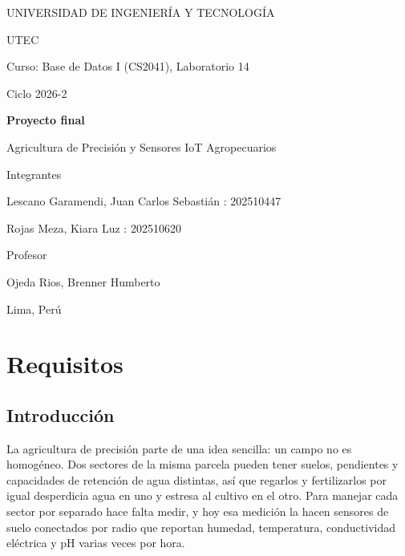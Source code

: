 \documentclass[11pt,letterpaper]{article}
\begin{document}
\begin{titlepage}
\centering
{\large UNIVERSIDAD DE INGENIERÍA Y TECNOLOGÍA\par}
\vspace{0.3cm}
{\large UTEC\par}
\vspace{2.2cm}
{\normalsize Curso: Base de Datos I (CS2041), Laboratorio 14\par}
\vspace{0.3cm}
{\normalsize Ciclo 2026-2\par}
\vspace{2cm}
{\LARGE\bfseries Proyecto final\par}
\vspace{0.4cm}
{\Large Agricultura de Precisión y Sensores IoT Agropecuarios\par}
\vspace{2.4cm}
{\large Integrantes\par}
\vspace{0.3cm}
Lescano Garamendi, Juan Carlos Sebastián : 202510447\par
Rojas Meza, Kiara Luz : 202510620\par
\vspace{1.6cm}
{\large Profesor\par}
\vspace{0.3cm}
Ojeda Rios, Brenner Humberto\par
\vfill
{\normalsize Lima, Perú\par}
\end{titlepage}

\tableofcontents
\newpage

\section{Requisitos}

\subsection{Introducción}

La agricultura de precisión parte de una idea sencilla: un campo no es homogéneo. Dos sectores de la misma parcela pueden tener suelos, pendientes y capacidades de retención de agua distintas, así que regarlos y fertilizarlos por igual desperdicia agua en uno y estresa al cultivo en el otro. Para manejar cada sector por separado hace falta medir, y hoy esa medición la hacen sensores de suelo conectados por radio que reportan humedad, temperatura, conductividad eléctrica y pH varias veces por hora.
\end{document}
